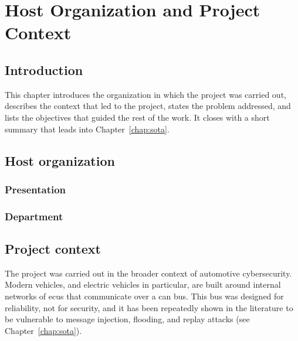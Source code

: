 \chapter{Host Organization and Project Context}
\label{chap:host}

\section{Introduction}

This chapter introduces the organization in which the project was carried out, describes the context that led to the project, states the problem addressed, and lists the objectives that guided the rest of the work. It closes with a short summary that leads into Chapter~\ref{chap:sota}.

\section{Host organization}

\subsection{Presentation}


\subsection{Department}


\section{Project context}

The project was carried out in the broader context of automotive cybersecurity. Modern vehicles, and electric vehicles in particular, are built around internal networks of \gls{ecu}s that communicate over a \gls{can} bus. This bus was designed for reliability, not for security, and it has been repeatedly shown in the literature to be vulnerable to message injection, flooding, and replay attacks (see Chapter~\ref{chap:sota}).

